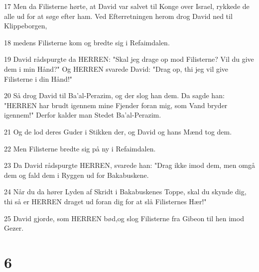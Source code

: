 \par 17 Men da Filisterne hørte, at David var salvet til Konge over Israel, rykkede de alle ud for at søge efter ham. Ved Efterretningen herom drog David ned til Klippeborgen,
\par 18 medens Filisterne kom og bredte sig i Refaimdalen.
\par 19 David rådspurgte da HERREN: "Skal jeg drage op mod Filisterne? Vil du give dem i min Hånd?" Og HERREN svarede David: "Drag op, thi jeg vil give Filisterne i din Hånd!"
\par 20 Så drog David til Ba'al-Perazim, og der slog han dem. Da sagde han: "HERREN har brudt igennem mine Fjender foran mig, som Vand bryder igennem!" Derfor kalder man Stedet Ba'al-Perazim.
\par 21 Og de lod deres Guder i Stikken der, og David og hans Mænd tog dem.
\par 22 Men Filisterne bredte sig på ny i Refaimdalen.
\par 23 Da David rådspurgte HERREN, svarede han: "Drag ikke imod dem, men omgå dem og fald dem i Ryggen ud for Bakabuskene.
\par 24 Når du da hører Lyden af Skridt i Bakabuskenes Toppe, skal du skynde dig, thi så er HERREN draget ud foran dig for at slå Filisternes Hær!"
\par 25 David gjorde, som HERREN bød,og slog Filisterne fra Gibeon til hen imod Gezer.

\chapter{6}

